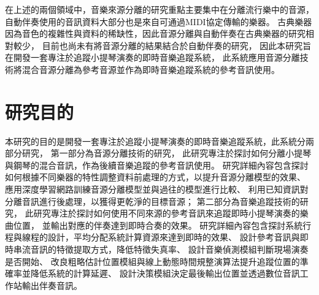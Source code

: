 \documentclass[class=NCU_thesis, crop=false]{standalone}
\begin{document}
在上述的兩個領域中，音樂來源分離的研究重點主要集中在分離流行樂中的音源，
自動伴奏使用的音訊資料大部分也是來自可通過MIDI協定傳輸的樂器。
古典樂器因為音色的複雜性與資料的稀缺性，因此音源分離與自動伴奏在古典樂器的研究相對較少，
目前也尚未有將音源分離的結果結合於自動伴奏的研究，
因此本研究旨在開發一套專注於追蹤小提琴演奏的即時音樂追蹤系統，
此系統應用音源分離技術將混合音源分離為參考音源並作為即時音樂追蹤系統的參考音訊使用。

\pagebreak

\section{研究目的}

本研究的目的是開發一套專注於追蹤小提琴演奏的即時音樂追蹤系統，此系統分兩部分研究，
第一部分為音源分離技術的研究，
此研究專注於探討如何分離小提琴與鋼琴的混合音訊，作為後續音樂追蹤的參考音訊使用。
研究詳細內容包含探討如何根據不同樂器的特性調整資料前處理的方式，以提升音源分離模型的效果、
應用深度學習網路訓練音源分離模型並與過往的模型進行比較、
利用已知資訊對分離音訊進行後處理，以獲得更乾淨的目標音源；
第二部分為音樂追蹤技術的研究，
此研究專注於探討如何使用不同來源的參考音訊來追蹤即時小提琴演奏的樂曲位置，
並輸出對應的伴奏達到即時合奏的效果。
研究詳細內容包含探討系統行程與線程的設計，平均分配系統計算資源來達到即時的效果、
設計參考音訊與即時串流音訊的特徵提取方式，降低特徵失真率、
設計音樂偵測模組判斷現場演奏是否開始、
改良粗略估計位置模組與線上動態時間規整演算法提升追蹤位置的準確率並降低系統的計算延遲、
設計決策模組決定最後輸出位置並透過數位音訊工作站輸出伴奏音訊。
\end{document}
